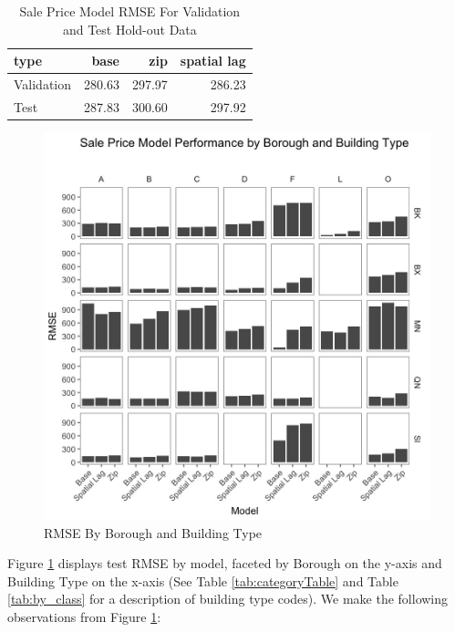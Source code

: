 \documentclass[12pt,]{article}
\begin{document}
\begin{table}

\caption{\label{tab:Sale Price Evaluations}\label{tab:SalePriceEval} Sale Price Model RMSE For Validation and Test Hold-out Data}
\centering
\begin{tabular}[t]{lrrr}
\toprule
type & base & zip & spatial lag\\
\midrule
Validation & 280.63 & 297.97 & 286.23\\
Test & 287.83 & 300.60 & 297.92\\
\bottomrule
\end{tabular}
\end{table}

\begin{figure}[H]
\includegraphics[width=1\linewidth]{Sections/tables and figures/RMSE by boro and build type} \caption{RMSE By Borough and Building Type}\label{fig:RMSE by boro and build type}
\end{figure}

Figure \ref{fig:RMSE by boro and build type} displays test RMSE by
model, faceted by Borough on the y-axis and Building Type on the x-axis
(See Table \ref{tab:categoryTable} and Table \ref{tab:by_class} for a
description of building type codes). We make the following observations
from Figure \ref{fig:RMSE by boro and build type}:
\end{document}

